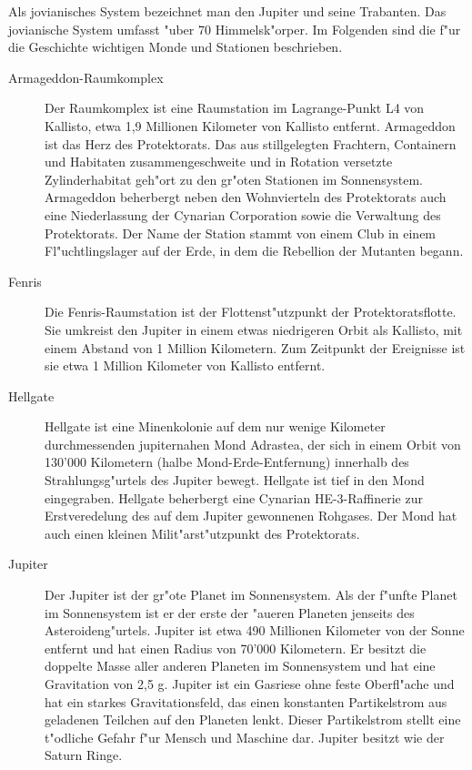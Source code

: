 
Als jovianisches System bezeichnet man den Jupiter und seine Trabanten. Das jovianische System umfasst "uber 70 Himmelsk"orper. Im Folgenden sind die f"ur die Geschichte wichtigen Monde und Stationen beschrieben.

\begin{description}
\item [Armageddon-Raumkomplex] Der Raumkomplex ist eine Raumstation im Lagrange-Punkt L4 von Kallisto, etwa 1,9 Millionen Kilometer von 
      Kallisto entfernt. Armageddon ist das Herz des Protektorats. Das aus stillgelegten Frachtern, Containern und Habitaten zusammengeschwei\3te und in Rotation versetzte Zylinderhabitat geh"ort zu den gr"o\3ten Stationen im Sonnensystem. Armageddon beherbergt neben den Wohnvierteln des Protektorats auch eine Niederlassung der Cynarian Corporation sowie die Verwaltung des Protektorats. Der Name der Station stammt von einem Club in einem Fl"uchtlingslager auf der Erde, in dem die Rebellion der Mutanten begann.
\item [Fenris] Die Fenris-Raumstation ist der Flottenst"utzpunkt der Protektoratsflotte. Sie umkreist den Jupiter in einem etwas niedrigeren 
      Orbit als Kallisto, mit einem Abstand von 1 Million Kilometern. Zum Zeitpunkt der Ereignisse ist sie etwa 1 Million Kilometer von Kallisto entfernt.
\item [Hellgate] Hellgate ist eine Minenkolonie auf dem nur wenige Kilometer durchmessenden jupiternahen Mond Adrastea, der sich in einem 
      Orbit von 130'000 Kilometern (halbe Mond-Erde-Entfernung) innerhalb des Strahlungsg"urtels des Jupiter bewegt. Hellgate ist tief in den Mond eingegraben. Hellgate beherbergt eine Cynarian HE-3-Raffinerie zur Erstveredelung des auf dem Jupiter gewonnenen Rohgases. Der Mond hat auch einen kleinen Milit"arst"utzpunkt des Protektorats.
\item [Jupiter] Der Jupiter ist der gr"o\3te Planet im Sonnensystem. Als der f"unfte Planet im Sonnensystem ist er der erste der "au\3eren 
      Planeten jenseits des Asteroideng"urtels. Jupiter ist etwa 490 Millionen Kilometer von der Sonne entfernt und hat einen Radius von 70'000 Kilometern. Er besitzt die doppelte Masse aller anderen Planeten im Sonnensystem und hat eine Gravitation von 2,5 g. Jupiter ist ein Gasriese ohne feste Oberfl"ache und hat ein starkes Gravitationsfeld, das einen konstanten Partikelstrom aus geladenen Teilchen auf den Planeten lenkt. Dieser Partikelstrom stellt eine t"odliche Gefahr f"ur Mensch und Maschine dar. Jupiter besitzt wie der Saturn Ringe.

\end{description}
